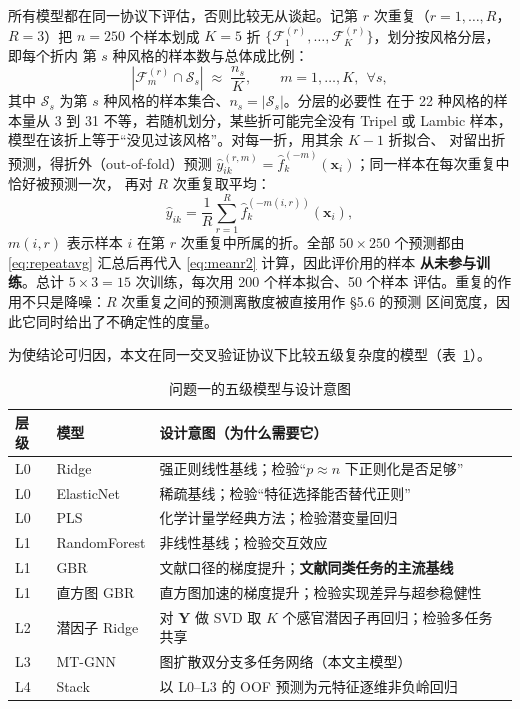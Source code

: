 所有模型都在同一协议下评估，否则比较无从谈起。记第 $r$ 次重复（$r=1,\dots,R$，
$R=3$）把 $n=250$ 个样本划成 $K=5$ 折
$\{\mathcal{F}^{(r)}_1,\dots,\mathcal{F}^{(r)}_K\}$，划分按风格分层，即每个折内
第 $s$ 种风格的样本数与总体成比例：
\begin{equation}
\left|\mathcal{F}^{(r)}_m\cap\mathcal{S}_s\right|
\;\approx\;\frac{n_s}{K},\qquad m=1,\dots,K,\ \ \forall s ,
\label{eq:strat}
\end{equation}
其中 $\mathcal{S}_s$ 为第 $s$ 种风格的样本集合、$n_s=|\mathcal{S}_s|$。分层的必要性
在于 22 种风格的样本量从 3 到 31 不等，若随机划分，某些折可能完全没有 Tripel 或
Lambic 样本，模型在该折上等于“没见过该风格”。对每一折，用其余 $K-1$ 折拟合、
对留出折预测，得折外（out-of-fold）预测
$\hat y^{(r,m)}_{ik}=\hat f^{(-m)}_{k}(\bm x_i)$；同一样本在每次重复中恰好被预测一次，
再对 $R$ 次重复取平均：
\begin{equation}
\hat y_{ik}=\frac{1}{R}\sum_{r=1}^{R}\hat f^{(-m(i,r))}_{k}(\bm x_i),
\label{eq:repeatavg}
\end{equation}
$m(i,r)$ 表示样本 $i$ 在第 $r$ 次重复中所属的折。全部 $50\times250$ 个预测都由
\eqref{eq:repeatavg} 汇总后再代入 \eqref{eq:meanr2} 计算，因此评价用的样本
\textbf{从未参与训练}。总计 $5\times3=15$ 次训练，每次用 200 个样本拟合、50 个样本
评估。重复的作用不只是降噪：$R$ 次重复之间的预测离散度被直接用作 \S5.6 的预测
区间宽度，因此它同时给出了不确定性的度量。

为使结论可归因，本文在同一交叉验证协议下比较五级复杂度的模型（表~\ref{tab:models}）。

\begin{table}[H]
\centering
\caption{问题一的五级模型与设计意图}
\label{tab:models}
\small
\begin{fittable}
\begin{tabular}{@{}llp{}@{}}
\toprule
层级 & 模型 & 设计意图（为什么需要它） \\
\midrule
L0 & Ridge & 强正则线性基线；检验“$p\approx n$ 下正则化是否足够” \\
L0 & ElasticNet & 稀疏基线；检验“特征选择能否替代正则” \\
L0 & PLS & 化学计量学经典方法\cite{wold2001}；检验潜变量回归 \\
L1 & RandomForest & 非线性基线\cite{breiman2001}；检验交互效应 \\
L1 & GBR & 文献口径的梯度提升\cite{chen2016}；\textbf{文献同类任务的主流基线} \\
L1 & 直方图 GBR & 直方图加速的梯度提升；检验实现差异与超参稳健性 \\
L2 & 潜因子 Ridge & 对 $\bm{Y}$ 做 SVD 取 $K$ 个感官潜因子再回归；检验多任务共享 \\
L3 & MT-GNN & 图扩散双分支多任务网络（本文主模型） \\
L4 & Stack & 以 L0--L3 的 OOF 预测为元特征逐维非负岭回归 \\
\bottomrule
\end{tabular}
\end{fittable}
\end{table}

